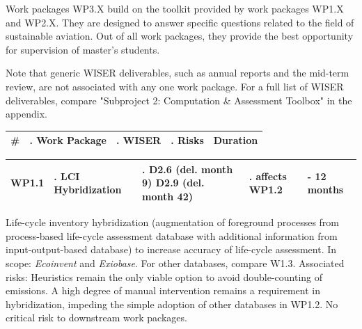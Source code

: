 \documentclass{article}
\begin{document}
    Work packages WP3.X build on the toolkit provided by work packages WP1.X and WP2.X. They are designed to answer specific questions related to the field of sustainable aviation. Out of all work packages, they provide the best opportunity for supervision of master's students.

    Note that generic WISER deliverables, such as annual reports and the mid-term review, are not associated with any one work package. For a full list of WISER deliverables, compare "Subproject 2: Computation \& Assessment Toolbox" in the appendix.

    \begin{table}[H]
        \centering
        
        \begin{tabularx}{\linewidth}{
            |>{\hsize=0.25\hsize}X
            |>{\hsize=1.\hsize}X
            |>{\hsize=1.\hsize}X
            |>{\hsize=1.\hsize}X
            |>{\hsize=0.75\hsize}X|
          } %
            \hline
                \textbf{\#} & \textbf{Work Package} & \textbf{WISER} & \textbf{Risks} & \textbf{Duration}
            \\
            \hline
        \end{tabularx}
        
        \begin{tabularx}{\linewidth}{
            |>{\hsize=0.25\hsize}X
            |>{\hsize=1.\hsize}X
            |>{\hsize=1.\hsize}X
            |>{\hsize=1.\hsize}X
            |>{\hsize=0.75\hsize}X|
          } %
            \hline
                WP1.1
            &
                LCI Hybridization 
            &
                D2.6 (del. month 9) \newline D2.9 (del. month 42)
            &
                affects WP1.2
            &
                11 - 12 months
            \\
            \hline
        \end{tabularx}
        
    \end{table}
    \vspace*{-9pt}
    
    Life-cycle inventory hybridization (augmentation of foreground processes from process-based life-cycle assessment database with additional information from input-output-based database) to increase accuracy of life-cycle assessment. In scope: \textit{Ecoinvent} and \textit{Exiobase}. For other databases, compare W1.3. Associated risks: Heuristics remain the only viable option to avoid double-counting of emissions. A high degree of manual intervention remains a requirement in hybridization, impeding the simple adoption of other databases in WP1.2. No critical risk to downstream work packages.
\end{document}
